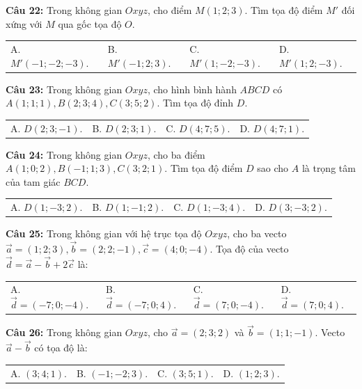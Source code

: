 \documentclass[12pt]{article}
\begin{document}
	\vspace{2mm}
	\noindent \textbf{Câu 22:} Trong không gian $Oxyz$, cho điểm $M(1; 2; 3)$. Tìm tọa độ điểm $M'$ đối xứng với $M$ qua gốc tọa độ $O$. \\
	\noindent
	\begin{tabular}{p{} p{} p{} p{}}
		A. $M'(-1; -2; -3)$. & B. $M'(-1; 2; 3)$. & C. $M'(1; -2; -3)$. & D. $M'(1; 2; -3)$.
	\end{tabular}
	
	\vspace{2mm}
	\noindent \textbf{Câu 23:} Trong không gian $Oxyz$, cho hình bình hành $ABCD$ có $A(1; 1; 1), B(2; 3; 4), C(3; 5; 2)$. Tìm tọa độ đỉnh $D$. \\
	\noindent
	\begin{tabular}{p{} p{} p{} p{}}
		A. $D(2; 3; -1)$. & B. $D(2; 3; 1)$. & C. $D(4; 7; 5)$. & D. $D(4; 7; 1)$.
	\end{tabular}
	
	\vspace{2mm}
	\noindent \textbf{Câu 24:} Trong không gian $Oxyz$, cho ba điểm $A(1; 0; 2), B(-1; 1; 3), C(3; 2; 1)$. Tìm tọa độ điểm $D$ sao cho $A$ là trọng tâm của tam giác $BCD$. \\
	\noindent
	\begin{tabular}{p{} p{} p{} p{}}
		A. $D(1; -3; 2)$. & B. $D(1; -1; 2)$. & C. $D(1; -3; 4)$. & D. $D(3; -3; 2)$.
	\end{tabular}
	
	\noindent \textbf{Câu 25:} Trong không gian với hệ trục tọa độ $Oxyz$, cho ba vecto $\vec{a} = (1; 2; 3), \vec{b} = (2; 2; -1), \vec{c} = (4; 0; -4)$. Tọa độ của vecto $\vec{d} = \vec{a} - \vec{b} + 2\vec{c}$ là: \\
	\noindent
	\begin{tabular}{p{} p{} p{} p{}}
		A. $\vec{d} = (-7; 0; -4)$. & B. $\vec{d} = (-7; 0; 4)$. & C. $\vec{d} = (7; 0; -4)$. & D. $\vec{d} = (7; 0; 4)$.
	\end{tabular}
	
	\vspace{2mm}
	\noindent \textbf{Câu 26:} Trong không gian $Oxyz$, cho $\vec{a} = (2; 3; 2)$ và $\vec{b} = (1; 1; -1)$. Vecto $\vec{a} - \vec{b}$ có tọa độ là: \\
	\noindent
	\begin{tabular}{p{} p{} p{} p{}}
		A. $(3; 4; 1)$. & B. $(-1; -2; 3)$. & C. $(3; 5; 1)$. & D. $(1; 2; 3)$.
	\end{tabular}
	
\end{document}
